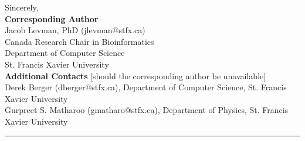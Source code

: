 \documentclass[10pt,a4paper]{article}
\begin{document}


\bigskip

\noindent
Sincerely, \\

\small
\noindent
\textbf{Corresponding Author}\\
Jacob Levman, PhD (jlevman@stfx.ca) \\
Canada Research Chair in Bioinformatics \\
Department of Computer Science \\
St. Francis Xavier University \\

\noindent
\textbf{Additional Contacts} [should the corresponding author be unavailable]\\
Derek Berger (dberger@stfx.ca), Department of Computer Science, St. Francis Xavier University\\
Gurpreet S. Matharoo (gmatharo@stfx.ca), Department of Physics, St. Francis Xavier University

% 

\footnotesize
\begin{center}
\noindent\rule{6cm}{0.4pt}
\end{center}

\AtNextBibliography{\footnotesize}
\printbibliography[heading=none]
\end{document}
